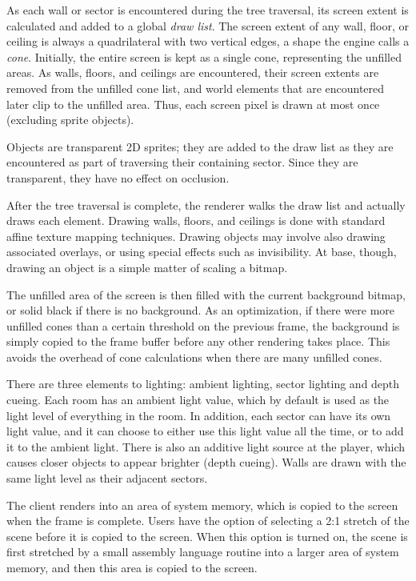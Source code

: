 As each wall or sector is encountered during the tree traversal, its
screen extent is calculated and added to a global {\em draw list}.
The screen extent of any wall, floor, or ceiling is always a
quadrilateral with two vertical edges, a shape the engine calls a {\em
cone}.  Initially, the entire screen is kept as a single cone,
representing the unfilled areas.  As walls, floors, and ceilings are
encountered, their screen extents are removed from the unfilled cone
list, and world elements that are encountered later clip to the
unfilled area.  Thus, each screen pixel is drawn at most once
(excluding sprite objects).

Objects are transparent 2D sprites; they are added to the draw list as
they are encountered as part of traversing their containing sector.
Since they are transparent, they have no effect on occlusion.

After the tree traversal is complete, the renderer walks the draw list
and actually draws each element.  Drawing walls, floors, and ceilings
is done with standard affine texture mapping techniques.  Drawing
objects may involve also drawing associated overlays, or using special
effects such as invisibility.  At base, though, drawing an object is a
simple matter of scaling a bitmap.

The unfilled area of the screen is then filled with the current
background bitmap, or solid black if there is no background.  As an
optimization, if there were more unfilled cones than a certain
threshold on the previous frame, the background is simply copied to
the frame buffer before any other rendering takes place.  This avoids
the overhead of cone calculations when there are many unfilled cones.

There are three elements to lighting: ambient lighting, sector
lighting and depth cueing.  Each room has an ambient light value,
which by default is used as the light level of everything in the room.
In addition, each sector can have its own light value, and it can
choose to either use this light value all the time, or to add it to
the ambient light.  There is also an additive light source at the
player, which causes closer objects to appear brighter (depth cueing).
Walls are drawn with the same light level as their adjacent sectors.

The client renders into an area of system memory, which is copied to
the screen when the frame is complete.  Users have the option of
selecting a 2:1 stretch of the scene before it is copied to the
screen.  When this option is turned on, the scene is first stretched
by a small assembly language routine into a larger area of system
memory, and then this area is copied to the screen.

